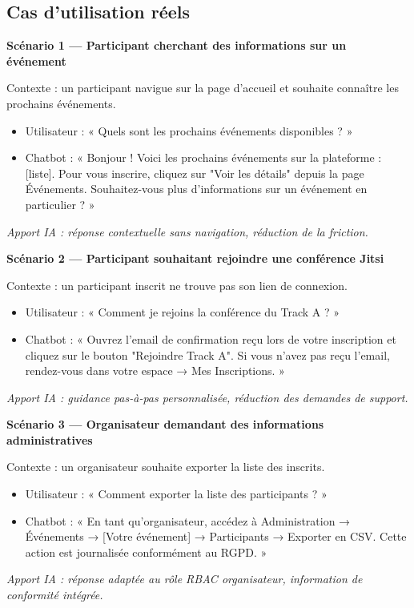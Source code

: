 \subsection{Cas d'utilisation réels}

\textbf{Scénario 1 — Participant cherchant des informations sur un événement}

Contexte : un participant navigue sur la page d'accueil et souhaite connaître les prochains événements.
\begin{itemize}
    \item Utilisateur : « Quels sont les prochains événements disponibles ? »
    \item Chatbot : « Bonjour ! Voici les prochains événements sur la plateforme : [liste]. Pour vous inscrire, cliquez sur "Voir les détails" depuis la page Événements. Souhaitez-vous plus d'informations sur un événement en particulier ? »
\end{itemize}
\textit{Apport IA : réponse contextuelle sans navigation, réduction de la friction.}

\textbf{Scénario 2 — Participant souhaitant rejoindre une conférence Jitsi}

Contexte : un participant inscrit ne trouve pas son lien de connexion.
\begin{itemize}
    \item Utilisateur : « Comment je rejoins la conférence du Track A ? »
    \item Chatbot : « Ouvrez l'email de confirmation reçu lors de votre inscription et cliquez sur le bouton "Rejoindre Track A". Si vous n'avez pas reçu l'email, rendez-vous dans votre espace → Mes Inscriptions. »
\end{itemize}
\textit{Apport IA : guidance pas-à-pas personnalisée, réduction des demandes de support.}

\textbf{Scénario 3 — Organisateur demandant des informations administratives}

Contexte : un organisateur souhaite exporter la liste des inscrits.
\begin{itemize}
    \item Utilisateur : « Comment exporter la liste des participants ? »
    \item Chatbot : « En tant qu'organisateur, accédez à Administration → Événements → [Votre événement] → Participants → Exporter en CSV. Cette action est journalisée conformément au RGPD. »
\end{itemize}
\textit{Apport IA : réponse adaptée au rôle RBAC organisateur, information de conformité intégrée.}


